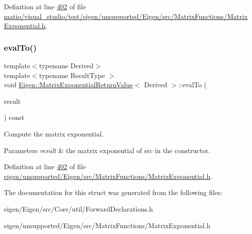 Definition at line \hyperlink{matio_2visual__studio_2test_2eigen_2unsupported_2_eigen_2src_2_matrix_functions_2_matrix_exponential_8h_source_l00402}{402} of file \hyperlink{matio_2visual__studio_2test_2eigen_2unsupported_2_eigen_2src_2_matrix_functions_2_matrix_exponential_8h_source}{matio/visual\+\_\+studio/test/eigen/unsupported/\+Eigen/src/\+Matrix\+Functions/\+Matrix\+Exponential.\+h}.

\mbox{\label{struct_eigen_1_1_matrix_exponential_return_value_a3dd2c65c7c6cdc41ab17415ee11899a0}} 
\subsubsection{\texorpdfstring{eval\+To()}{evalTo()}\hspace{0.1cm}{\footnotesize\ttfamily [2/2]}}
{\footnotesize\ttfamily template$<$typename Derived$>$ \\
template$<$typename Result\+Type $>$ \\
void \hyperlink{struct_eigen_1_1_matrix_exponential_return_value}{Eigen\+::\+Matrix\+Exponential\+Return\+Value}$<$ Derived $>$\+::eval\+To (\begin{DoxyParamCaption}\item[{Result\+Type \&}]{result }\end{DoxyParamCaption}) const\hspace{0.3cm}{\ttfamily [inline]}}



Compute the matrix exponential. 


\begin{DoxyParams}{Parameters}
{\em result} & the matrix exponential of {\ttfamily src} in the constructor. \\
\hline
\end{DoxyParams}


Definition at line \hyperlink{eigen_2unsupported_2_eigen_2src_2_matrix_functions_2_matrix_exponential_8h_source_l00402}{402} of file \hyperlink{eigen_2unsupported_2_eigen_2src_2_matrix_functions_2_matrix_exponential_8h_source}{eigen/unsupported/\+Eigen/src/\+Matrix\+Functions/\+Matrix\+Exponential.\+h}.



The documentation for this struct was generated from the following files\+:\begin{DoxyCompactItemize}
\item 
eigen/\+Eigen/src/\+Core/util/\+Forward\+Declarations.\+h\item 
eigen/unsupported/\+Eigen/src/\+Matrix\+Functions/\+Matrix\+Exponential.\+h\end{DoxyCompactItemize}
